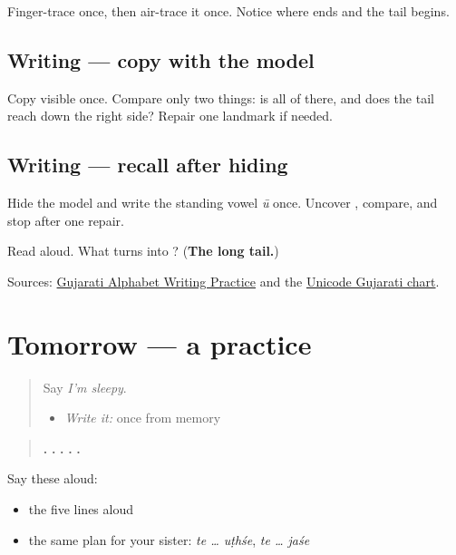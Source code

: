 Finger-trace \textbf{} once, then air-trace it once. Notice where \textbf{} ends and the tail begins.

\subsection*{Writing — copy with the model}
Copy visible \textbf{} once. Compare only two things: is all of \textbf{} there, and does the tail reach down the right side? Repair one landmark if needed.

\subsection*{Writing — recall after hiding}
Hide the model and write the standing vowel \emph{ū} once. Uncover \textbf{}, compare, and stop after one repair.

\begin{tcolorbox}[breakable,colback=teal!4,colframe=teal!35!black,title={Before you move on}]
Read \textbf{  } aloud. What turns \textbf{} into \textbf{}? (\textbf{The long tail.})

Sources: \href{https://www.t30apps.com/gujarati-alphabet-writing/}{Gujarati Alphabet Writing Practice} and the \href{https://www.unicode.org/charts/PDF/U0A80.pdf}{Unicode Gujarati chart}.
\end{tcolorbox}
\section[Practice]{Tomorrow — a practice}

\label{lesson:GU-C149-future-practice}



\begin{quote}
Say \emph{I'm sleepy}.

\begin{itemize}
\raggedright
  \item \emph{Write it:} \textbf{} once from memory
\end{itemize}
\end{quote}

\begin{tcolorbox}[breakable,skin=enhanced,colback=orange!6,colframe=orange!45!black,boxrule=0.5pt,arc=1mm,left=6pt,right=6pt,top=4pt,bottom=4pt,fonttitle=\bfseries,title={Read this}]
\begin{quote}
\textbf{    .} \textbf{   .} \textbf{   .} \textbf{   .} \textbf{   .}
\end{quote}

Say these aloud:

\begin{itemize}
\raggedright
  \item the five lines aloud
  \item the same plan for your sister: \emph{te … uṭhśe}, \emph{te … jaśe}
\end{itemize}
\end{tcolorbox}

